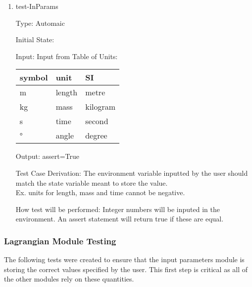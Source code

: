 \documentclass[12pt, titlepage]{article}
\begin{document}
\begin{enumerate}				
\item{test-InParams\\}

Type: Automaic 

Initial State: 

Input: Input from Table of Units:\\
  \noindent \begin{tabular}{l l l} 
    \toprule		
    \textbf{symbol} & \textbf{unit} & \textbf{SI}\\
    \midrule 
    \si{\metre} & length & metre\\
    \si{\kilogram} & mass & kilogram\\
    \si{\second} & time & second\\
    \si{\degree} & angle & degree\\
    \bottomrule
  \end{tabular}

Output: assert=True

Test Case Derivation: The environment variable inputted by the user should 
match the state variable meant to store the value.\\
Ex. units for length, mass and time cannot be negative.

How test will be performed: Integer numbers will be inputed in the environment. An assert statement will return true if these 
are equal.

    
\end{enumerate}

\subsubsection{\progname Lagrangian Module Testing}

The following tests were created to ensure that the input parameters module is 
storing the correct values specified by the user. This first step is critical 
as all of the other modules rely on these quantities.
\end{document}
